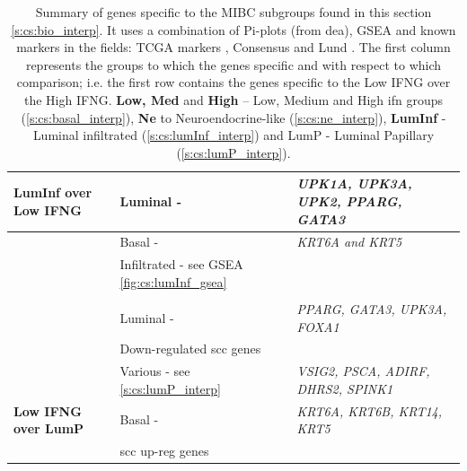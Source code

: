 \begin{table}[!htb]
\begin{tabularx}{\textwidth}{>{\hsize=0.8\hsize}X|>{\hsize=1.1\hsize}X|>{\hsize=1.1\hsize}X}
    \midrule  
    \textbf{LumInf over Low IFNG} & Luminal - \citep{Robertson2017-mg} & \textit{UPK1A, UPK3A, UPK2, PPARG, GATA3} \\
    \midrule
    \multirow{2}{=}{\parbox[t]{\hsize}{\textbf{Low IFNG over LumInf}}} & Basal - \citep{Robertson2017-mg} & \textit{KRT6A and KRT5} \\
    \cmidrule{2-3}
    & Infiltrated - see GSEA \cref{fig:cs:lumInf_gsea} & \\
    \midrule
    \multicolumn{3}{c}{\textbf{LumP - \cref{fig:cs:lumP_pi}}} \\
    \midrule  
    \multirow{3}{*}{\textbf{LumP}} & Luminal - \cite{Robertson2017-mg} & \textit{PPARG, GATA3, UPK3A, FOXA1} \\
    \cmidrule{2-3}
    & Down-regulated \acrshort{scc} genes \cite{Hurst2022-sp} & \\
    \cmidrule{2-3}
    & Various - see \cref{s:cs:lumP_interp} & \textit{VSIG2, PSCA, ADIRF, DHRS2, SPINK1} \\
    \midrule
    \textbf{Low IFNG over LumP} & Basal - \cite{Robertson2017-mg} & \textit{KRT6A, KRT6B, KRT14, KRT5} \\
    \midrule
    & \acrshort{scc} up-reg genes \citet{Hurst2022-sp} & \\
    \bottomrule
  \end{tabularx}
  \caption{Summary of genes specific to the MIBC subgroups found in this section \cref{s:cs:bio_interp}. It uses a combination of Pi-plots (from \acrshort{dea}), GSEA and known markers in the fields: TCGA markers \citet{Robertson2017-mg}, Consensus \citet{Kamoun2020-tj} and Lund \citet{Marzouka2018-ge}. The first column represents the groups to which the genes specific and with respect to which comparison; i.e. the first row contains the genes specific to the Low IFNG over the High IFNG. \textbf{Low, Med} and \textbf{High} -- Low, Medium and High \acrlong{ifn} groups (\cref{s:cs:basal_interp}), \textbf{Ne} to Neuroendocrine-like (\cref{s:cs:ne_interp}), \textbf{LumInf} - Luminal infiltrated (\cref{s:cs:lumInf_interp}) and LumP - Luminal Papillary (\cref{s:cs:lumP_interp}).   }
  \label{tab:cs:genes_summaries}
\end{table}


